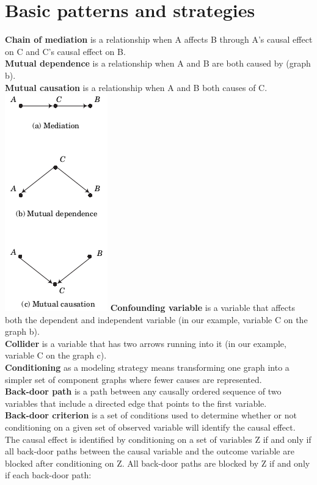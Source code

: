 \section*{Basic patterns and strategies} 

\textbf{Chain of mediation} is a relationship when A affects B through A's causal effect on C and C's causal effect on B.\\
\textbf{Mutual dependence} is a relationship when A and B are both caused by  (graph b).\\
\textbf{Mutual causation} is a relationship when A and B both causes of C. \\
\includegraphics[trim=0 -1cm 0 -1cm, center]{../material/basic_causal_relationships.png}
\textbf{Confounding variable} is a variable that affects both the dependent and independent variable (in our example, variable C on the graph b).\\
\textbf{Collider} is a variable that has two arrows running into it (in our example, variable C on the graph c).\\
\textbf{Conditioning} as a modeling strategy means transforming one graph into a simpler set of component graphs where fewer causes are represented.\\
\textbf{Back-door path} is a path between any causally ordered sequence  of two variables that include a directed edge that points to the first variable. \\
\textbf{Back-door criterion} is a set of conditions used to determine whether or not conditioning on a given set of observed variable will identify the causal effect. The causal effect is identified by conditioning on a set of variables Z if and only if all back-door paths between the causal variable and the outcome variable are blocked after conditioning on Z. All back-door paths are blocked by Z if and only if each back-door path:
